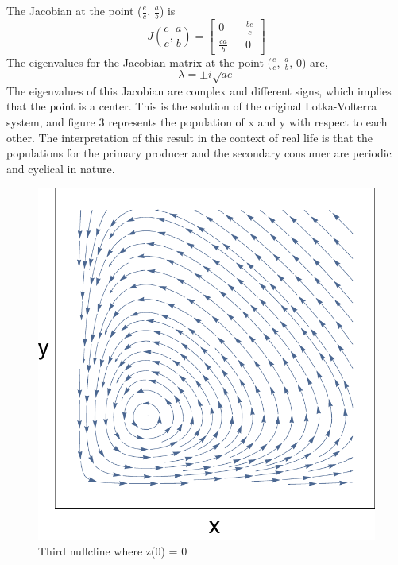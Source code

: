 \documentclass[11pt,oneside]{article}
\begin{document}
	The Jacobian at the point ($\frac{e}{c}$, $\frac{a}{b}$) is
	\begin{equation}
	J(\frac{e}{c},\frac{a}{b}) = 
	\begin{bmatrix}
	0 && \frac{be}{c} \\
	\frac{ca}{b} && 0
	\end{bmatrix}
	\end{equation}
	The eigenvalues for the Jacobian matrix at the point ($\frac{e}{c}$, $\frac{a}{b}$, $0$) are,
	\[\lambda = \pm i\sqrt{ae}\]
	The eigenvalues of this Jacobian are complex and different signs, which implies that the point is a center. This is the solution of the original Lotka-Volterra system, and figure 3 represents the population of x and y with respect to each other. The interpretation of this result in the context of real life is that the populations for the primary producer and the secondary consumer are periodic and cyclical in nature.
	
	
	\begin{figure}[H]
		\center
		\includegraphics[scale=0.5]{XY}
		\caption{Third nullcline where z(0) = 0}
	\end{figure}
	
\end{document}

